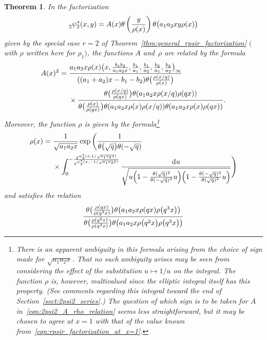 \documentclass[pdftex]{sigma}
\numberwithin{equation}{section}
\newtheorem{Theorem}{Theorem}[section]
\newcommand{\dd}{\mathrm{d}}
\begin{document}
\begin{Theorem} \label{thm:2psi2_factorization}
In the factorization
\begin{equation} \label{eqn:weak_2psi2ast_factorization}
_2^{}\psi_2^\ast(x,y) = A(x) \theta\left({y \over \rho(x)}\right) \theta \bigl( a_1a_2xy\rho(x) \bigr)
\end{equation}
given by the special case $r=2$ of Theorem~{\rm\ref{thm:general_rpsir_factorization}} $($with $\rho$ written here for $\rho_1)$, the functions $A$ and~$\rho$ are related by the formula
\begin{align}
A(x)^2 = {}&\frac{a_1a_2x \rho(x) \bigl(x,{b_1b_2 \over a_1a_2x},{b_1 \over a_1},{b_1 \over a_2},{b_2 \over a_1},{b_2 \over a_2}\bigr)_{ \infty} }{ ((a_1+a_2)x-b_1-b_2) \theta\bigl({\rho(x/q) \over \rho(x)}\bigr)}\nonumber\\
&\times \frac{ \theta\bigl( {\rho(x/q) \over \rho(qx)} \bigr) \theta( a_1a_2x\rho(x/q)\rho(qx)) }{\theta\bigl({\rho(x) \over \rho(qx)}\bigr) \theta (a_1a_2x\rho(x)\rho(x/q) ) \theta (a_1a_2x\rho(x)\rho(qx) )}.\label{eqn:2psi2_A_rho_relation}
\end{align}
Moreover, the function $\rho$ is given by the formula\footnote{There is an apparent ambiguity in this formula arising from the choice of sign made for $\sqrt{a_1a_2x}$. That no such ambiguity arises may be seen from considering the effect of the substitution $u \mapsto 1/u$ on the integral. The function $\rho$ is, however, multivalued since the elliptic integral itself has this property. (See comments regarding this integral toward the end of Section~\ref{sect:2psi2_series}.) The question of which sign is to be taken for $A$ in~\eqref{eqn:2psi2_A_rho_relation} seems less straightforward, but it may be chosen to agree at $x=1$ with that of the value known from~\eqref{eqn:rpsir_factorization_at_x=1}.}
\begin{align}
\rho(x) = {}&{1 \over \sqrt{a_1a_2x}}\exp \bigg( {1 \over \theta\bigl(\sqrt{q}\bigr)\theta(-\sqrt{q})} \nonumber \\
&\times\int_0^{-{_2^{}\psi_2^\ast(x,1/\sqrt{a_1a_2x}) \over _2^{}\psi_2^\ast(x,-1/\sqrt{a_1a_2x})}} {\dd u \over \sqrt{u\Bigl( 1-{\theta(\sqrt{q})^2 \over \theta(-\sqrt{q})^2}u\Bigr)\Bigl( 1-{\theta(-\sqrt{q})^2 \over \theta(\sqrt{q})^2}u\Bigr)}} \Bigg) \label{eqn:rho_integral_formula}
\end{align}
and satisfies the relation
\begin{gather}
{\theta\bigl({\rho(qx) \over \rho(q^3x)}\bigr) \theta\bigl(a_1a_2x\rho(qx)\rho\bigl(q^3x\bigr)\bigr) \over \theta\bigl({\rho(q^2x) \over \rho(q^3x)}\bigr) \theta\bigl(a_1a_2x\rho\bigl(q^2x\bigr)\rho\bigl(q^3x\bigr)\bigr)} \nonumber\\

\end{gather}
\end{Theorem}
\end{document}
